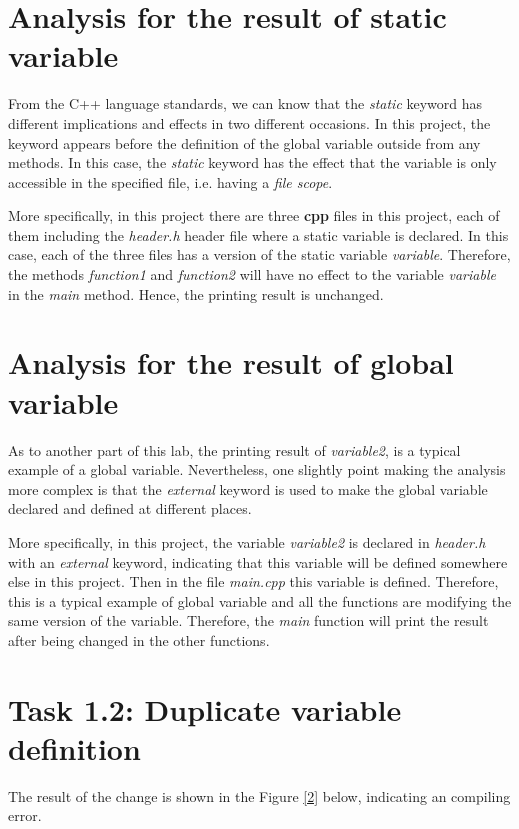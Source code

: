 \documentclass[a4paper]{report}
\begin{document}
\section{Analysis for the result of static variable}
From the C++ language standards, we can know that the \emph{static} keyword has different implications and effects in two different occasions. In this project, the keyword appears before the definition of the global variable outside from any methods. In this case, the \emph{static} keyword has the effect that the variable is only accessible in the specified file, i.e. having a \emph{file scope}.
\par
More specifically, in this project there are three \textbf{cpp} files in this project, each of them including the \emph{header.h} header file where a static variable is declared. In this case, each of the three files has a version of the static variable \emph{variable}. Therefore, the methods \emph{function1} and \emph{function2} will have no effect to the variable \emph{variable} in the \emph{main} method. Hence, the printing result is unchanged.

\section{Analysis for the result of global variable}
As to another part of this lab, the printing result of \emph{variable2}, is a typical example of a global variable. Nevertheless, one slightly point making the analysis more complex is that the \emph{external} keyword is used to make the global variable declared and defined at different places. 
\par
More specifically, in this project, the variable \emph{variable2} is declared in \emph{header.h} with an \emph{external} keyword, indicating that this variable will be defined somewhere else in this project. Then in the file \emph{main.cpp} this variable is defined. Therefore, this is a typical example of global variable and all the functions are modifying the same version of the variable. Therefore, the \emph{main} function will print the result after being changed in the other functions.

\section{Task 1.2: Duplicate variable definition}
The result of the change is shown in the Figure \ref{2} below, indicating an compiling error.
\end{document}
